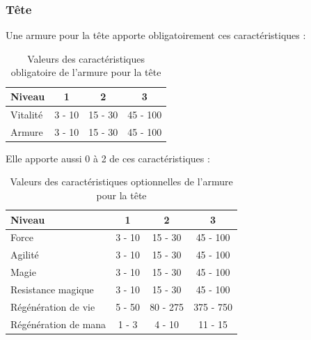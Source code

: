 \documentclass[11pt, a4paper, oneside]{report}
\begin{document}
\subsubsection{Tête}
Une armure pour la tête apporte obligatoirement ces caractéristiques :
\begin{table}[H]
\begin{center}
\begin{tabular}{| l | c | c | c |}
  \hline      
  Niveau 				& 1 & 2 & 3\\ \hline \hline
  Vitalité 				& 3 - 10 & 15 - 30 & 45 - 100\\ \hline
  Armure 				& 3 - 10 & 15 - 30 & 45 - 100\\ \hline
\end{tabular}
\caption{Valeurs des caractéristiques obligatoire de l'armure pour la tête}
\end{center}
\end{table}
Elle apporte aussi 0 à 2 de ces caractéristiques :
\begin{table}[H]
\begin{center}
\begin{tabular}{| l | c | c | c |}
  \hline      
  Niveau 				& 1 & 2 & 3\\ \hline \hline                 
  Force 				& 3 - 10 & 15 - 30 & 45 - 100\\ \hline
  Agilité 				& 3 - 10 & 15 - 30 & 45 - 100\\ \hline
  Magie 				& 3 - 10 & 15 - 30 & 45 - 100\\ \hline
  Resistance magique 	& 3 - 10 & 15 - 30 & 45 - 100\\ \hline
  Régénération de vie 	& 5 - 50  & 80 - 275 & 375 - 750\\ \hline
  Régénération de mana 	& 1 - 3  & 4 - 10 & 11 - 15\\ \hline
\end{tabular}
\caption{Valeurs des caractéristiques optionnelles de l'armure pour la tête}
\end{center}
\end{table}
\end{document}
